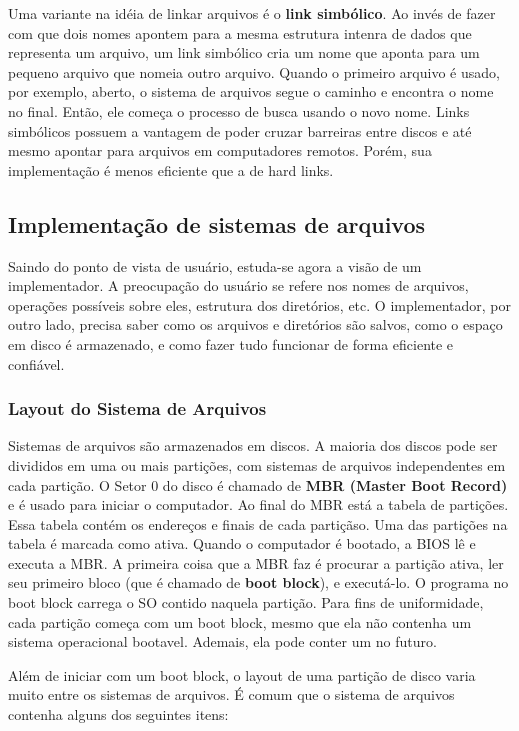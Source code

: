 \documentclass[10pt]{article}
\begin{document}
Uma variante na idéia de linkar arquivos é o \textbf{link simbólico}. Ao invés de fazer com que dois nomes apontem para a 
mesma estrutura intenra de dados que representa um arquivo, um link simbólico cria um nome que aponta para um
pequeno arquivo que nomeia outro arquivo. Quando o primeiro arquivo é usado, por exemplo, aberto,
o  sistema de arquivos segue o caminho e encontra o nome no final. Então, ele começa o processo de busca
usando o novo nome. Links simbólicos possuem a vantagem de poder cruzar barreiras entre discos e até
mesmo apontar para arquivos em computadores remotos. Porém, sua implementação é menos eficiente
que a de hard links.

\subsection{Implementação de sistemas de arquivos}
Saindo do ponto de vista de usuário, estuda-se agora a visão de um implementador. A preocupação
do usuário se refere nos nomes de arquivos, operações possíveis sobre eles, estrutura dos 
diretórios, etc. O implementador, por outro lado, precisa saber como os arquivos e diretórios são
salvos, como o espaço em disco é armazenado, e como fazer tudo funcionar de forma eficiente e
confiável.

\subsubsection{Layout do Sistema de Arquivos}
\item Sistemas de arquivos são armazenados em discos. A maioria dos discos pode ser divididos
em uma ou mais partições, com sistemas de arquivos independentes em cada partição. O Setor 0
do disco é chamado de \textbf{MBR (Master Boot Record)} e é usado para iniciar o computador.
Ao final do MBR está a tabela de partições. Essa tabela contém os endereços e finais de cada
partiçãso. Uma das partições na tabela é marcada como ativa. Quando o computador é bootado,
a BIOS lê e executa a MBR. A primeira coisa que a MBR faz é procurar a partição ativa, ler
seu primeiro bloco (que é chamado de \textbf{boot block}), e executá-lo. O programa no 
boot block carrega o SO contido naquela partição. Para fins de uniformidade, cada partição
começa com um boot block, mesmo que ela não contenha um sistema operacional bootavel. Ademais,
ela pode conter um no futuro.

Além de iniciar com um boot block, o layout de uma partição de disco varia muito entre os
sistemas de arquivos. É comum que o sistema de arquivos contenha alguns dos seguintes itens:
\end{document}
